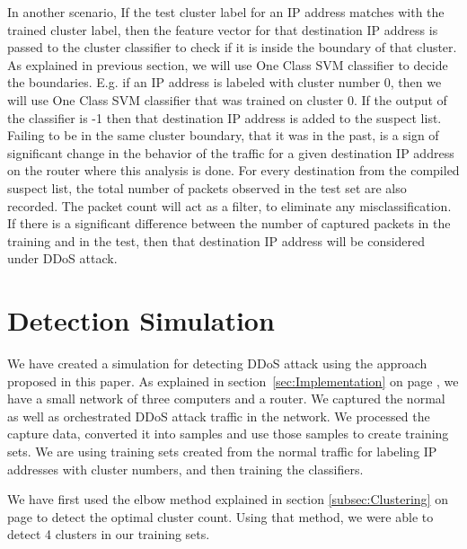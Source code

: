 \documentclass[12pt,oneside,a4paper]{article}
\begin{document}
In another scenario, If the test cluster label for an IP address matches with the trained cluster label, then the feature vector for that destination IP address is passed to the cluster classifier to check if it is inside the boundary of that cluster. As explained in previous section, we will use One Class SVM classifier to decide the boundaries. E.g. if an IP address is labeled with cluster number 0, then we will use One Class SVM classifier that was trained on cluster 0. If the output of the classifier is -1 then that destination IP address is added to the suspect list. Failing to be in the same cluster boundary, that it was in the past, is a sign of significant change in the behavior of the traffic for a given destination IP address on the router where this analysis is done. For every destination from the compiled suspect list, the total number of packets observed in the test set are also recorded. The packet count will act as a filter, to eliminate any misclassification. If there is a significant difference between the number of captured packets in the training and in the test, then that destination IP address will be considered under DDoS attack.
\pagebreak
\section{Detection Simulation}

We have created a simulation for detecting DDoS attack using the approach proposed in this paper. As explained in section~\ref{sec:Implementation} on page \pageref{sec:Implementation}, we have a small network of three computers and a router. We captured the normal as well as orchestrated DDoS attack traffic in the network. We processed the capture data, converted it into samples and use those samples to create training sets. We are using training sets created from the normal traffic for labeling IP addresses with cluster numbers, and then training the classifiers.

We have first used the elbow method explained in section \ref{subsec:Clustering} on page \pageref{subsec:Clustering} to detect the optimal cluster count. Using that method, we were able to detect 4 clusters in our training sets.
\end{document}
